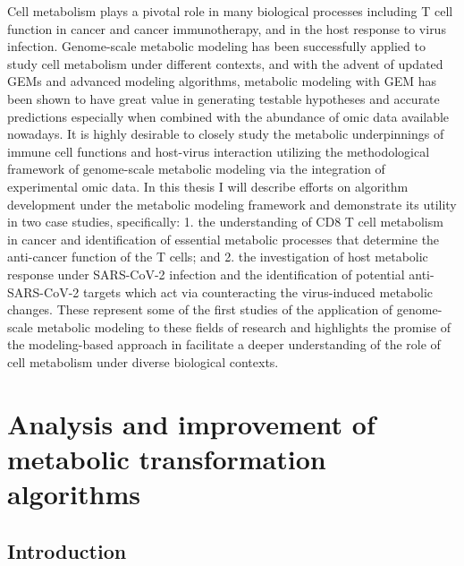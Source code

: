 \documentclass[12pt,twoside,openany,\mydriver]{thesis}  %
\begin{document}
Cell metabolism plays a pivotal role in many biological processes including T cell function in cancer and cancer immunotherapy, and in the host response to virus infection. Genome-scale metabolic modeling has been successfully applied to study cell metabolism under different contexts, and with the advent of updated GEMs and advanced modeling algorithms, metabolic modeling with GEM has been shown to have great value in generating testable hypotheses and accurate predictions especially when combined with the abundance of omic data available nowadays. It is highly desirable to closely study the metabolic underpinnings of immune cell functions and host-virus interaction utilizing the methodological framework of genome-scale metabolic modeling via the integration of experimental omic data. In this thesis I will describe efforts on algorithm development under the metabolic modeling framework and demonstrate its utility in two case studies, specifically: 1. the understanding of CD8 T cell metabolism in cancer and identification of essential metabolic processes that determine the anti-cancer function of the T cells; and 2. the investigation of host metabolic response under SARS-CoV-2 infection and the identification of potential anti-SARS-CoV-2 targets which act via counteracting the virus-induced metabolic changes. These represent some of the first studies of the application of genome-scale metabolic modeling to these fields of research and highlights the promise of the modeling-based approach in facilitate a deeper understanding of the role of cell metabolism under diverse biological contexts.

\hypertarget{mta}{%
\chapter{Analysis and improvement of metabolic transformation algorithms}\label{mta}}

\hypertarget{introduction}{%
\section{Introduction}\label{introduction}}
\end{document}

